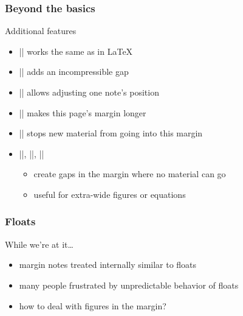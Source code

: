 \documentclass{beamer}
\begin{document}
\begin{frame}[fragile]
  \frametitle{Beyond the basics}
  \begin{block}{Additional features}
    \begin{itemize}
    \item |\marginparpush| works the same as in \LaTeX
    \item || adds an incompressible gap
    \item || allows adjusting one note's position
    \item || makes this page's margin longer
    \item |\clearmargin| stops new material from going into this margin
    \item |\blockmargin|, |\unblockmargin|, ||
      \vskip-0.3pc
      \begin{itemize}
      \item create gaps in the margin where no material can go
      \item useful for extra-wide figures or equations
      \end{itemize}
    \end{itemize}
  \end{block}
\end{frame}

\begin{frame}
  \frametitle{Floats}
  \begin{block}{While we're at it\ldots}
    \begin{itemize}
    \item margin notes treated internally similar to floats
    \item many people frustrated by unpredictable behavior of floats
    \item how to deal with figures in the margin?
    \end{itemize}
  \end{block}
\end{frame}
\end{document}
